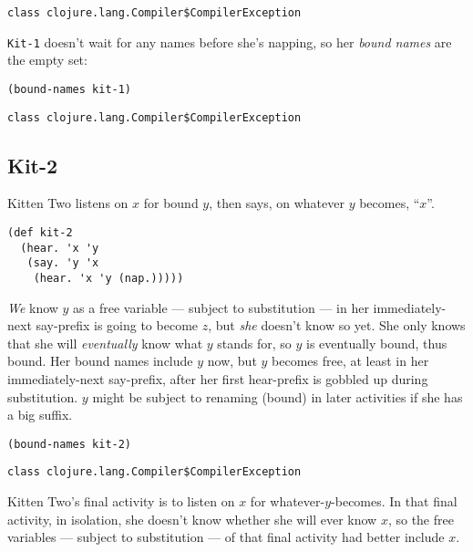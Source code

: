 \documentclass[10pt,oneside,x11names]{article}
\theoremstyle{definition}
\theoremstyle{warning}
\begin{document}
\begin{verbatim}
class clojure.lang.Compiler$CompilerException
\end{verbatim}


\texttt{Kit-1} doesn't wait for any names before she's napping, so her
\emph{bound names} are the empty set:

\vskip 0.26cm
\begin{verbatim}
(bound-names kit-1)
\end{verbatim}

\begin{verbatim}
class clojure.lang.Compiler$CompilerException
\end{verbatim}


\newpage
\subsection{Kit-2}
\label{sec:org0d553b9}

Kitten Two listens on \(x\) for bound \(y\), then says, on whatever
\(y\) becomes, ``\(x\)''.

\vskip 0.26cm
\begin{verbatim}
(def kit-2
  (hear. 'x 'y
   (say. 'y 'x
    (hear. 'x 'y (nap.)))))
\end{verbatim}

\emph{We} know \(y\) as a free variable --- subject to substitution ---
in her immediately-next say-prefix is going to become \(z\), but
\emph{she} doesn't know so yet. She only knows that she will
\emph{eventually} know what \(y\) stands for, so \(y\) is eventually bound,
thus bound. Her bound names include \(y\) now, but \(y\) becomes free,
at least in her immediately-next say-prefix, after her first
hear-prefix is gobbled up during substitution. \(y\) might be
subject to renaming (bound) in later activities if she has a big
suffix.

\vskip 0.26cm
\begin{verbatim}
(bound-names kit-2)
\end{verbatim}

\begin{verbatim}
class clojure.lang.Compiler$CompilerException
\end{verbatim}


Kitten Two's final activity is to listen on \(x\) for
whatever-\(y\)-becomes. In that final activity, in isolation, she
doesn't know whether she will ever know \(x\), so the free variables
--- subject to substitution --- of that final activity had better
include \(x\).
\end{document}
